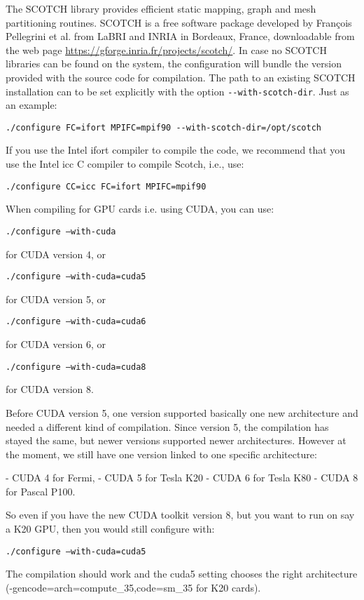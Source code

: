 The SCOTCH library \citep{PeRo96} provides efficient static mapping,
graph and mesh partitioning routines. SCOTCH is a free software package
developed by Fran\c{c}ois Pellegrini et al. from LaBRI and INRIA in Bordeaux,
France, downloadable from the web page \url{https://gforge.inria.fr/projects/scotch/}.
In case no SCOTCH libraries can be found on the system, the configuration
will bundle the version provided with the source code for compilation.
The path to an existing SCOTCH installation can to be set explicitly
with the option \texttt{-{}-with-scotch-dir}. Just as an example:
\begin{verbatim}
./configure FC=ifort MPIFC=mpif90 --with-scotch-dir=/opt/scotch
\end{verbatim}
\noindent
If you use the Intel ifort compiler to compile the code, we recommend
that you use the Intel icc C compiler to compile Scotch, i.e., use:
\begin{verbatim}
./configure CC=icc FC=ifort MPIFC=mpif90
\end{verbatim}

When compiling for GPU cards i.e. using CUDA, you can use:

\texttt{./configure --with-cuda}

for CUDA version 4, or

\texttt{./configure --with-cuda=cuda5}

for CUDA version 5, or

\texttt{./configure --with-cuda=cuda6}

for CUDA version 6, or

\texttt{./configure --with-cuda=cuda8}

for CUDA version 8.

Before CUDA version 5, one version supported basically one new architecture and needed a different kind of compilation.
Since version 5, the compilation has stayed the same, but newer versions supported newer architectures.
However at the moment, we still have one version linked to one specific architecture:

- CUDA 4 for Fermi,
- CUDA 5 for Tesla K20
- CUDA 6 for Tesla K80
- CUDA 8 for Pascal P100.

So even if you have the new CUDA toolkit version 8, but you want to run on say a K20 GPU, then you would still configure with:

\texttt{./configure --with-cuda=cuda5}

The compilation should work and the cuda5 setting chooses the right architecture (-gencode=arch=compute\_35,code=sm\_35 for K20 cards).

